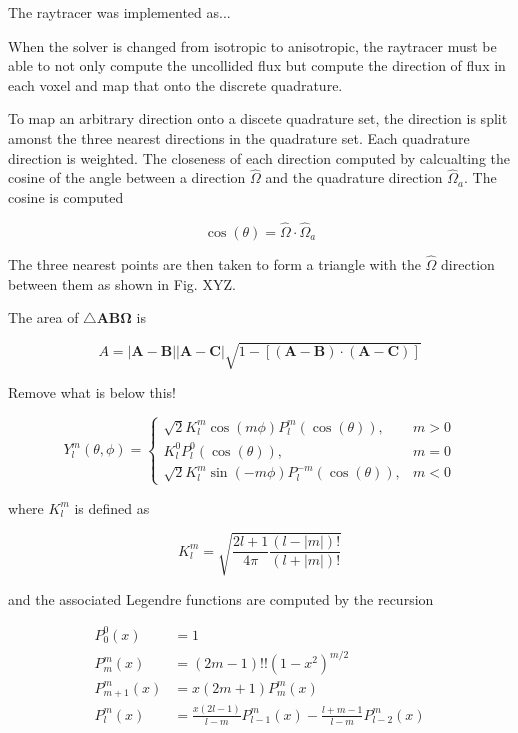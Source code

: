\documentclass{article}
\numberwithin{equation}{subsection}
\begin{document}
The raytracer was implemented as...

When the solver is changed from isotropic to anisotropic, the raytracer must be able to not only compute the uncollided flux but compute the direction of flux in each voxel and map that onto the discrete quadrature.

To map an arbitrary direction onto a discete quadrature set, the direction is split amonst the three nearest directions in the quadrature set. Each quadrature direction is weighted. The closeness of each direction computed by calcualting the cosine of the angle between a direction $\hat{\Omega}$ and the quadrature direction $\hat{\Omega}_a$. The cosine is computed

\begin{equation}
\cos(\theta) = \hat{\Omega} \cdot \hat{\Omega}_a
\end{equation}

The three nearest points are then taken to form a triangle with the $\hat{\Omega}$ direction between them as shown in Fig. XYZ.

The area of $\triangle \mathbf{A} \mathbf{B} \mathbf{\Omega}$ is

\begin{equation}
A = |\mathbf{A}-\mathbf{B}| |\mathbf{A}-\mathbf{C}| \sqrt{1-\left[ (\mathbf{A}-\mathbf{B}) \cdot (\mathbf{A}-\mathbf{C}) \right]}
\end{equation}

Remove what is below this!

\begin{equation}
    Y_l^m(\theta, \phi)= 
\begin{cases}
\sqrt{2} K_l^m \cos(m \phi) P_l^m(\cos(\theta)),      & m > 0 \\
K_l^0 P_l^0(\cos(\theta)),              & m = 0  \\
\sqrt{2} K_l^m \sin(-m \phi) P_l^{-m}(\cos(\theta)),           & m < 0
\end{cases}
\end{equation}

where $K_l^m$ is defined as

\begin{equation}
K_l^m = \sqrt{\frac{2l+1}{4 \pi} \frac{(l-|m|)!}{(l+|m|)!}}
\end{equation}

and the associated Legendre functions are computed by the recursion

\begin{equation}
\begin{aligned}
P_0^0(x) &= 1 \\
P_m^m(x) &= (2m-1)!!(1-x^2)^{m/2} \\
P_{m+1}^m(x) &= x(2m+1)P_m^m(x) \\
P_l^m(x) &= \frac{x(2l-1)}{l-m} P_{l-1}^m (x) - \frac{l+m-1}{l-m} P_{l-2}^m (x)
\end{aligned}
\end{equation}
\end{document}
